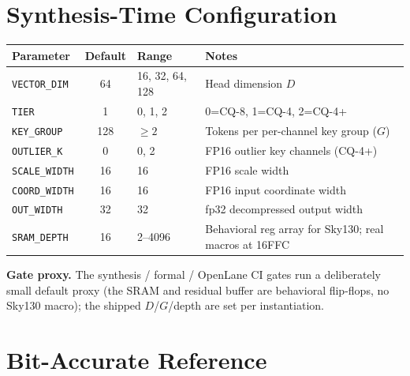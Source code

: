 \documentclass[11pt]{article}
\begin{document}
\section{Synthesis-Time Configuration}
\label{sec:syntime}

\begin{table}[h]
\centering
\small
\begin{tabular}{@{}l c l p{5cm}@{}}
\toprule
Parameter             & Default & Range                   & Notes \\
\midrule
\texttt{VECTOR\_DIM}    & 64  & 16, 32, 64, 128          & Head dimension $D$ \\
\texttt{TIER}           & 1   & 0, 1, 2                  & 0=CQ-8, 1=CQ-4, 2=CQ-4+ \\
\texttt{KEY\_GROUP}     & 128 & $\geq 2$                 & Tokens per per-channel key group ($G$) \\
\texttt{OUTLIER\_K}     & 0   & 0, 2                     & FP16 outlier key channels (CQ-4+) \\
\texttt{SCALE\_WIDTH}   & 16  & 16                       & FP16 scale width \\
\texttt{COORD\_WIDTH}   & 16  & 16                       & FP16 input coordinate width \\
\texttt{OUT\_WIDTH}     & 32  & 32                       & fp32 decompressed output width \\
\texttt{SRAM\_DEPTH}    & 16  & 2--4096                  & Behavioral reg array for Sky130; real macros at 16FFC \\
\bottomrule
\end{tabular}
\end{table}

\noindent\textbf{Gate proxy.} The synthesis / formal / OpenLane CI gates run a
deliberately small default proxy (the SRAM and residual buffer are behavioral
flip-flops, no Sky130 macro); the shipped $D$/$G$/depth are set per instantiation.

\section{Bit-Accurate Reference}
\label{sec:ref}
\end{document}

